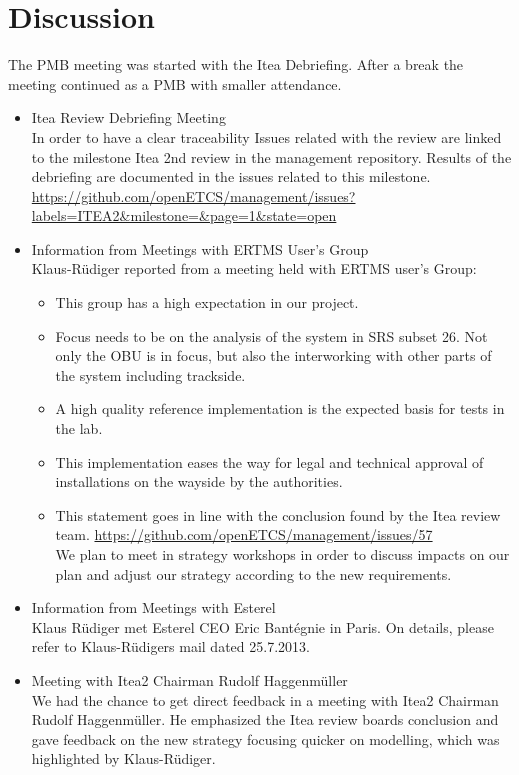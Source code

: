 \documentclass[a4paper, 11pt]{article}
\begin{document}
\section{Discussion}
The PMB meeting was started with the Itea Debriefing. After a break the meeting continued as a PMB with smaller attendance.

\begin{itemize}
\item Itea Review Debriefing Meeting\\
In order to have a clear traceability Issues related with the review are linked to the milestone Itea 2nd review in the management repository.
Results of the debriefing are documented in the issues related to this milestone.
\url{https://github.com/openETCS/management/issues?labels=ITEA2&milestone=&page=1&state=open}\\

\item Information from Meetings with ERTMS User's Group\\
Klaus-R\"udiger reported from a meeting held with ERTMS user's Group:
\begin{itemize}

\item This group has a high expectation in our project. 
\item Focus needs to be on the analysis of the system in SRS subset 26. Not only the OBU is in focus, but also the interworking with other parts of the system including trackside.
\item A high quality reference implementation is the expected basis for tests in the lab. \item This implementation eases the way for legal and technical approval of installations on the wayside by the authorities. 
\item This statement goes in line with the conclusion found by the Itea review team.
\url{https://github.com/openETCS/management/issues/57}\\
We plan to meet in strategy workshops in order to discuss impacts on our plan and adjust our strategy according to the new requirements.

\end{itemize}

\item Information from Meetings with Esterel\\
Klaus R\"udiger met Esterel CEO Eric Bant\'egnie in Paris. On details, please refer to Klaus-R\"udigers mail dated 25.7.2013.\\
\item Meeting with Itea2 Chairman Rudolf Haggenm\"uller\\
We had the chance to get direct feedback in a meeting with Itea2 Chairman Rudolf Haggenm\"uller. He emphasized the Itea review boards conclusion and gave feedback on the new strategy focusing quicker on modelling, which was highlighted by Klaus-R\"udiger.


\end{itemize}
\end{document}
